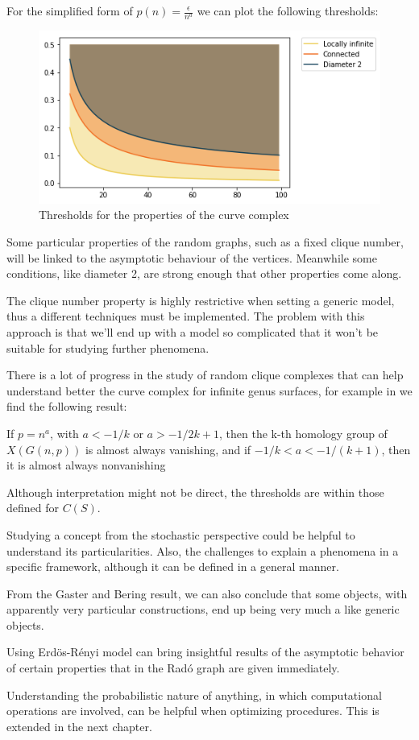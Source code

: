For the simplified form of $p(n) = \frac{\epsilon}{n^{a}}$ we can plot the following thresholds:

\begin{figure}[h!]
	\centering
	\includegraphics[scale=0.7]{Python/Figures/ER-thresholds.png}
	\caption{Thresholds for the properties of the curve complex}
\end{figure}

Some particular properties of the random graphs, such as a fixed clique number, will be linked to the asymptotic behaviour of the vertices. Meanwhile some conditions, like diameter 2, are strong enough that other properties come along.

The clique number property is highly restrictive when setting a generic model, thus a different techniques must be implemented. The problem with this approach is that we'll end up with a model so complicated that it won't be suitable for studying further phenomena.

There is a lot of progress in the study of random clique complexes that can help understand better the curve complex for infinite genus surfaces, for example in \cite[Khale,09]{kahle2009topology} we find the following result:
\begin{theorem}
If $p=n^{a}$, with $a < -1/k$ or
$a > -1/2k+1$, then the k-th homology group of $X(G(n, p))$ is almost always vanishing, and if $-1/k < a < -1/(k + 1)$, then it is almost always nonvanishing
\end{theorem}
Although interpretation might not be direct, the thresholds are within those defined for $C(S)$.

Studying a concept from the stochastic perspective could be helpful to understand its particularities. Also, the challenges to explain a phenomena in a specific framework, although it can be defined in a general manner.

From the Gaster and Bering result, we can also conclude that some objects, with apparently very particular constructions, end up being very much a like generic objects.

Using Erdös-Rényi model can bring insightful results of the asymptotic behavior of certain properties that in the Radó graph are given immediately.

Understanding the probabilistic nature of anything, in which computational operations are involved, can be helpful when optimizing procedures. This is extended in the next chapter.